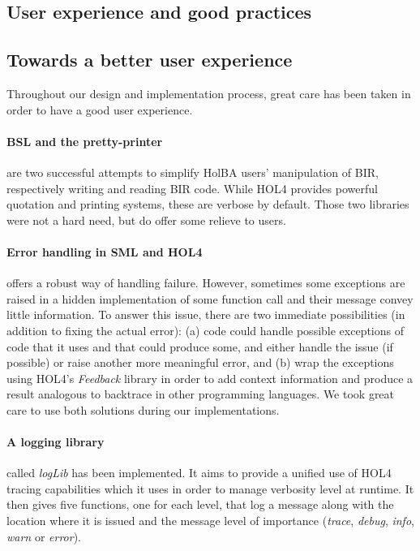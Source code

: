 \documentclass[10pt,a4paper]{article}
\begin{document}
\begin{multicols}{2}

\section{User experience and good practices} \label{user-friendliness}

\subsection{Towards a better user experience} \label{towards-user-exp}

Throughout our design and implementation process, great care has been taken in order to have a good user experience.

\paragraph{BSL and the pretty-printer} are two successful attempts to simplify HolBA users' manipulation of BIR, respectively writing and reading BIR code. While HOL4 provides powerful quotation and printing systems, these are verbose by default. Those two libraries were not a hard need, but do offer some relieve to users.

\paragraph{Error handling in SML and HOL4} offers a robust way of handling failure. However, sometimes some exceptions are raised in a hidden implementation of some function call and their message convey little information. To answer this issue, there are two immediate possibilities (in addition to fixing the actual error): (a) code could handle possible exceptions of code that it uses and that could produce some, and either handle the issue (if possible) or raise another more meaningful error, and (b) wrap the exceptions using HOL4's \textit{Feedback} library in order to add context information and produce a result analogous to backtrace in other programming languages. We took great care to use both solutions during our implementations.

\paragraph{A logging library} called \textit{logLib} has been implemented. It aims to provide a unified use of HOL4 tracing capabilities which it uses in order to manage verbosity level at runtime. It then gives five functions, one for each level, that log a message along with the location where it is issued and the message level of importance (\textit{trace}, \textit{debug}, \textit{info}, \textit{warn} or \textit{error}).


\end{multicols}
\end{document}
